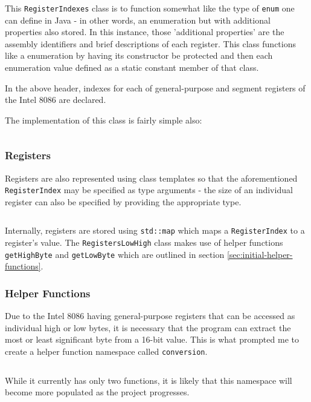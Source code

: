         \inputminted{c++}{code/initial/registerindexes.hpp}

        This \texttt{RegisterIndexes} class is to function somewhat like the type of \texttt{enum} one can define in Java - in other words, an enumeration but with additional properties also stored. In this instance, those 'additional properties' are the assembly identifiers and brief descriptions of each register. This class functions like a enumeration by having its constructor be protected and then each enumeration value defined as a static constant member of that class.

        In the above header, indexes for each of general-purpose and segment registers of the Intel 8086 are declared.

        The implementation of this class is fairly simple also:

        \inputminted{c++}{code/initial/registerindexes.cpp}

    \subsubsection{Registers}
        Registers are also represented using class templates so that the aforementioned \texttt{RegisterIndex} may be specified as type arguments - the size of an individual register can also be specified by providing the appropriate type.

        \inputminted{c++}{code/initial/registers.hpp}

        Internally, registers are stored using \texttt{std::map} which maps a \texttt{RegisterIndex} to a register's value. The \texttt{RegistersLowHigh} class makes use of helper functions \texttt{getHighByte} and \texttt{getLowByte} which are outlined in section \ref{sec:initial-helper-functions}.

    \subsubsection{Helper Functions}
        Due to the Intel 8086 having general-purpose registers that can be accessed as individual high or low bytes, it is necessary that the program can extract the most or least significant byte from a 16-bit value. This is what prompted me to create a helper function namespace called \texttt{conversion}.

        \inputminted{c++}{code/initial/conversion.hpp}

        While it currently has only two functions, it is likely that this namespace will become more populated as the project progresses.

